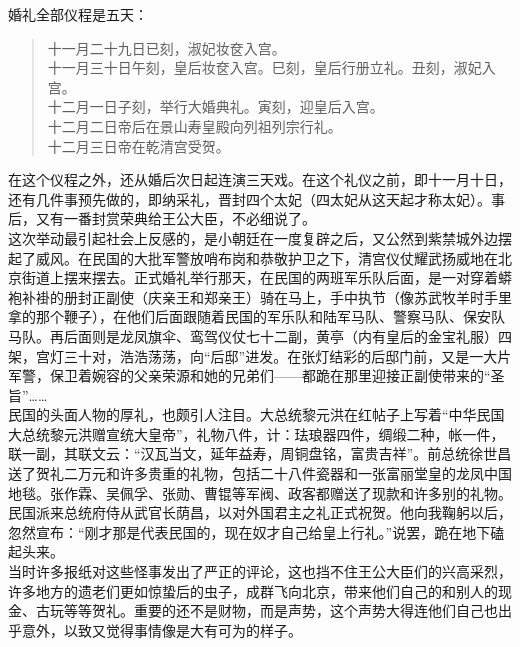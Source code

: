 婚礼全部仪程是五天：\\

\begin{quote}
	十一月二十九日已刻，淑妃妆奁入宫。\\

十一月三十日午刻，皇后妆奁入宫。巳刻，皇后行册立礼。丑刻，淑妃入宫。\\

十二月一日子刻，举行大婚典礼。寅刻，迎皇后入宫。\\

十二月二日帝后在景山寿皇殿向列祖列宗行礼。\\

十二月三日帝在乾清宫受贺。\\
\end{quote}

在这个仪程之外，还从婚后次日起连演三天戏。在这个礼仪之前，即十一月十日，还有几件事预先做的，即纳采礼，晋封四个太妃（四太妃从这天起才称太妃）。事后，又有一番封赏荣典给王公大臣，不必细说了。\\

这次举动最引起社会上反感的，是小朝廷在一度复辟之后，又公然到紫禁城外边摆起了威风。在民国的大批军警放哨布岗和恭敬护卫之下，清宫仪仗耀武扬威地在北京街道上摆来摆去。正式婚礼举行那天，在民国的两班军乐队后面，是一对穿着蟒袍补褂的册封正副使（庆亲王和郑亲王）骑在马上，手中执节（像苏武牧羊时手里拿的那个鞭子），在他们后面跟随着民国的军乐队和陆军马队、警察马队、保安队马队。再后面则是龙凤旗伞、鸾驾仪仗七十二副，黄亭（内有皇后的金宝礼服）四架，宫灯三十对，浩浩荡荡，向“后邸”进发。在张灯结彩的后邸门前，又是一大片军警，保卫着婉容的父亲荣源和她的兄弟们——都跪在那里迎接正副使带来的“圣旨”……\\

民国的头面人物的厚礼，也颇引人注目。大总统黎元洪在红帖子上写着“中华民国大总统黎元洪赠宣统大皇帝”，礼物八件，计：珐琅器四件，绸缎二种，帐一件，联一副，其联文云：“汉瓦当文，延年益寿，周铜盘铭，富贵吉祥”。前总统徐世昌送了贺礼二万元和许多贵重的礼物，包括二十八件瓷器和一张富丽堂皇的龙凤中国地毯。张作霖、吴佩孚、张勋、曹锟等军阀、政客都赠送了现款和许多别的礼物。\\

民国派来总统府侍从武官长荫昌，以对外国君主之礼正式祝贺。他向我鞠躬以后，忽然宣布：“刚才那是代表民国的，现在奴才自己给皇上行礼。”说罢，跪在地下磕起头来。\\

当时许多报纸对这些怪事发出了严正的评论，这也挡不住王公大臣们的兴高采烈，许多地方的遗老们更如惊蛰后的虫子，成群飞向北京，带来他们自己的和别人的现金、古玩等等贺礼。重要的还不是财物，而是声势，这个声势大得连他们自己也出乎意外，以致又觉得事情像是大有可为的样子。\\

